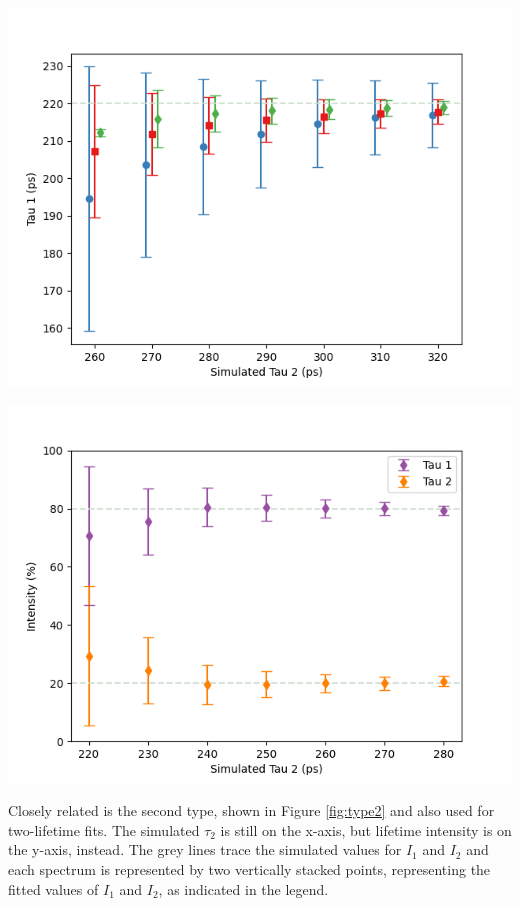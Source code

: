 \begin{minipage}{0.46\textwidth}
    \centering
    \includegraphics[width=\textwidth]{Batch 3/regular IRF/tau1 220/output/t1.png}
    \label{fig:type1}
\end{minipage}
\hfill
\begin{minipage}{0.46\textwidth}
    \centering
    \includegraphics[width=\textwidth]{Batch 1+2/8020.png}
    \label{fig:type2}
\end{minipage}

Closely related is the second type, shown in Figure \ref{fig:type2} and also used for two-lifetime fits. The simulated $\tau_2$ is still on the x-axis, but lifetime intensity is on the y-axis, instead. The grey lines trace the simulated values for $I_1$ and $I_2$ and each spectrum is represented by two vertically stacked points, representing the fitted values of $I_1$ and $I_2$, as indicated in the legend.

